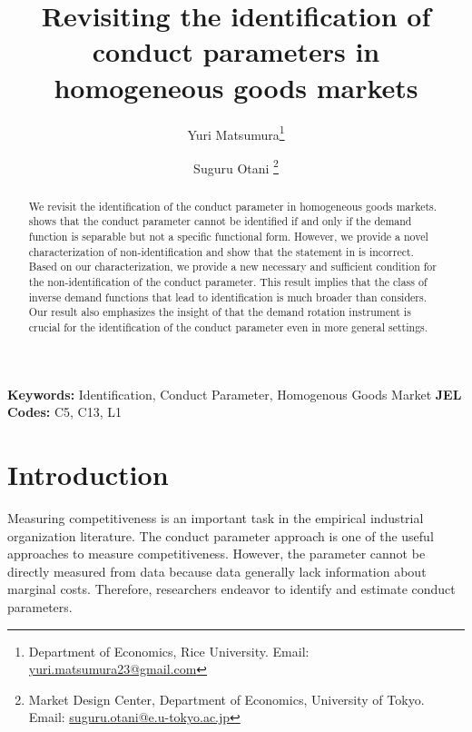 \documentclass[11pt, a4paper]{article}
\title{Revisiting the identification of conduct parameters in homogeneous goods markets}
\author{Yuri Matsumura\thanks{Department of Economics, Rice University. Email: \href{mailto:yuri.matsumura23@gmail.com}{yuri.matsumura23@gmail.com}} \and Suguru Otani \thanks{Market Design Center, Department of Economics, University of Tokyo. Email: \href{mailto:suguru.otani@e.u-tokyo.ac.jp}{suguru.otani@e.u-tokyo.ac.jp}
}}
\theoremstyle{remark}
\begin{document}
\maketitle
\begin{abstract}
    We revisit the identification of the conduct parameter in homogeneous goods markets.
    \citet{lau1982identifying} shows that the conduct parameter cannot be identified if and only if the demand function is separable but not a specific functional form.
    However, we provide a novel characterization of non-identification and show that the statement in \citet{lau1982identifying} is incorrect.
    Based on our characterization, we provide a new necessary and sufficient condition for the non-identification of the conduct parameter.
    This result implies that the class of inverse demand functions that lead to identification is much broader than \citet{lau1982identifying} considers.
    Our result also emphasizes the insight of \citet{bresnahan1982oligopoly} that the demand rotation instrument is crucial for the identification of the conduct parameter even in more general settings.
\end{abstract}

\noindent\textbf{Keywords:} Identification, Conduct Parameter, Homogenous Goods Market
\vspace{0in}
\newline
\noindent\textbf{JEL Codes:} C5, C13, L1

\bigskip




\newpage
\section{Introduction}
Measuring competitiveness is an important task in the empirical industrial organization literature.
The conduct parameter approach is one of the useful approaches to measure competitiveness.
However, the parameter cannot be directly measured from data because data generally lack information about marginal costs.
Therefore, researchers endeavor to identify and estimate conduct parameters.
\end{document}
